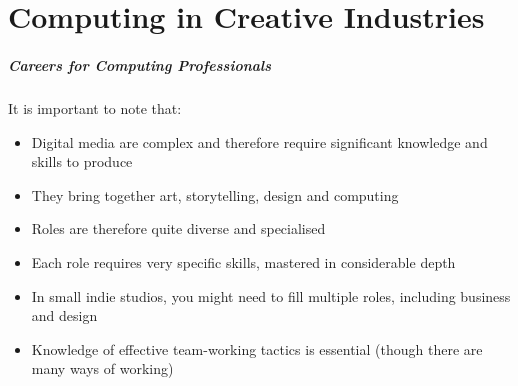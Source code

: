 










\part{Computing in Creative Industries}
\frame{\partpage}

\begin{frame}
	\frametitle{Careers for Computing Professionals}
	
	It is important to note that:\pause
	
	\begin{itemize}
		\item Digital media are complex and therefore require significant knowledge and skills to produce \pause
		\item They bring together art, storytelling, design and computing \pause
		\item Roles are therefore quite diverse and specialised \pause
		\item Each role requires very specific skills, mastered in considerable depth \pause
		\item In small indie studios, you might need to fill multiple roles, including business and design \pause
		\item Knowledge of effective team-working tactics is essential (though there are many ways of working)
	\end{itemize}
\end{frame}

